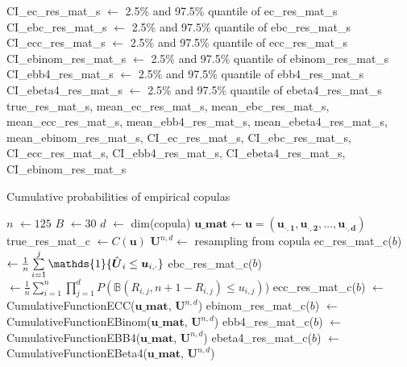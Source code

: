 \documentclass[12pt]{report}
\newcommand{\1}{\mathbf{1}}
\begin{document}
\begin{flushleft}
\begin{algorithm}[H]
\begin{algorithmic}
    \State CI\_ec\_res\_mat\_s $\gets$ 2.5\% and 97.5\% quantile of ec\_res\_mat\_s
    \State CI\_ebc\_res\_mat\_s $\gets$ 2.5\% and 97.5\% quantile of ebc\_res\_mat\_s
    \State CI\_ecc\_res\_mat\_s $\gets$ 2.5\% and 97.5\% quantile of ecc\_res\_mat\_s
    \State CI\_ebinom\_res\_mat\_s $\gets$ 2.5\% and 97.5\% quantile of ebinom\_res\_mat\_s
    \State CI\_ebb4\_res\_mat\_s $\gets$ 2.5\% and 97.5\% quantile of ebb4\_res\_mat\_s
    \State CI\_ebeta4\_res\_mat\_s $\gets$ 2.5\% and 97.5\% quantile of ebeta4\_res\_mat\_s
    \State \Return true\_res\_mat\_s, mean\_ec\_res\_mat\_s, mean\_ebc\_res\_mat\_s, mean\_ecc\_res\_mat\_s, mean\_ebb4\_res\_mat\_s, mean\_ebeta4\_res\_mat\_s, mean\_ebinom\_res\_mat\_s, CI\_ec\_res\_mat\_s, CI\_ebc\_res\_mat\_s, CI\_ecc\_res\_mat\_s, CI\_ebb4\_res\_mat\_s, CI\_ebeta4\_res\_mat\_s, CI\_ebinom\_res\_mat\_s
\EndProcedure
\end{algorithmic}
\end{algorithm}

\begin{algorithm}[H]
\caption{Cumulative probabilities of empirical copulas}
\begin{algorithmic}
 
    \State $n$ $\gets 125$
    \State $B$ $\gets 30$
    \State $d$ $\gets$ dim(copula)
    \State $\boldsymbol{u\_mat} \gets \boldsymbol{u} = (\boldsymbol{u_{\cdot,1}}, \boldsymbol{u_{\cdot,2}}, \dots, \boldsymbol{u_{\cdot,d}})$ 
    \State true\_res\_mat\_c $\gets C(\boldsymbol{u})$ 
        \State $\boldsymbol{U}^{n,d} \gets$ resampling from copula 
        \State ec\_res\_mat\_c($b$) $\gets \frac{1}{n} \sum\limits_{i = 1}^{j} \mathds{1}\{\Hat{\boldsymbol{U}}_{i} \le \boldsymbol{u}_{i,\cdot}\}$ 
        \State ebc\_res\_mat\_c($b$) $\gets \frac{1}{n}\sum\limits_{i = 1}^{n} \prod\limits_{j = 1}^{d} P(\mathbb{B}(R_{i,j}, n + 1 - R_{i,j}) \le u_{i,j})$)
        \State ecc\_res\_mat\_c($b$) $\gets$ CumulativeFunctionECC($\boldsymbol{u\_mat}$, $\boldsymbol{U}^{n,d}$)
        \State ebinom\_res\_mat\_c($b$) $\gets$ CumulativeFunctionEBinom($\mathbf{u\_mat}$, $\boldsymbol{U}^{n,d}$)
        \State ebb4\_res\_mat\_c($b$) $\gets$ CumulativeFunctionEBB4($\mathbf{u\_mat}$, $\boldsymbol{U}^{n,d}$)
        \State ebeta4\_res\_mat\_c($b$) $\gets$ CumulativeFunctionEBeta4($\mathbf{u\_mat}$, $\boldsymbol{U}^{n,d}$)


\end{algorithmic}
\end{algorithm}
\end{flushleft}
\end{document}
